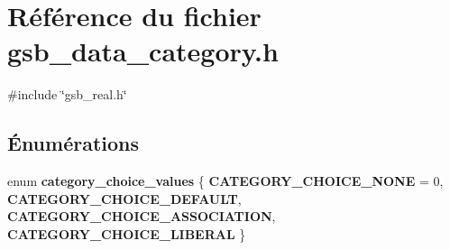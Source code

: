 \section{Référence du fichier gsb\_\-data\_\-category.h}
\label{gsb__data__category_8h}
{\ttfamily \#include \char`\"{}gsb\_\-real.h\char`\"{}}\par
\subsection*{Énumérations}
\begin{DoxyCompactItemize}
\item 
enum {\bf category\_\-choice\_\-values} \{ {\bf CATEGORY\_\-CHOICE\_\-NONE} =  0, 
{\bf CATEGORY\_\-CHOICE\_\-DEFAULT}, 
{\bf CATEGORY\_\-CHOICE\_\-ASSOCIATION}, 
{\bf CATEGORY\_\-CHOICE\_\-LIBERAL}
 \}
\end{DoxyCompactItemize}

